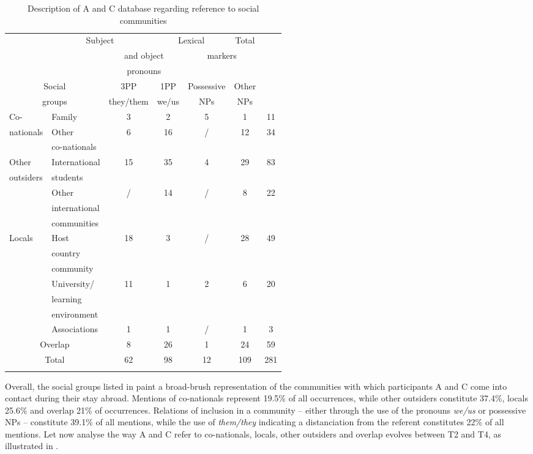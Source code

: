 \documentclass[output=paper]{langscibook}
\begin{document}
\begin{table}
\small
\begin{tabular}{llccccc}
\lsptoprule
\multicolumn{2}{c}{} & \multicolumn{2}{c}{{Subject}} & \multicolumn{2}{c}{{Lexical}} & {Total}\\
\multicolumn{2}{c}{} & \multicolumn{2}{c}{{and object}} & \multicolumn{2}{c}{{markers}} & \\
\multicolumn{2}{c}{} & \multicolumn{2}{c}{{pronouns}} & & \\
\midrule
\multicolumn{2}{c}{{Social}} & {3PP} & {1PP} & {Possessive} & {Other} & \\
\multicolumn{2}{c}{{groups}} &
{they/them} & {we/us} & {NPs} & {NPs} & \\
\midrule
{Co-} & {Family} & 3 & 2 & 5 & 1 & 11\\
{nationals} & {Other}& 6 & 16 & / & 12 & 34\\
&  {co-nationals} & & & & & \\
\midrule
{Other} & {International} & 15 & 35 & 4 & 29 & 83\\
{outsiders} &{students} & & & & & \\
& {Other} & / & 14 & / & 8 & 22\\
&{international}& & & & & \\
&{communities} & & & & & \\
\midrule
{Locals} & {Host} & 18 & 3 & / & 28 & 49\\
 &{country} & & & & & \\
 & {community} & & & & & \\
& {University/} & 11 & 1 & 2 & 6 & 20\\
& {learning} & & & & & \\
& {environment} & & & & & \\
& {Associations} & 1 & 1 & / & 1 & 3\\
\midrule
\multicolumn{2}{c}{{Overlap}} & 8 & 26 & 1 & 24 & 59\\
\midrule
\multicolumn{2}{c}{{Total}} & 62 & 98 & 12 & 109 & 281\\
\lspbottomrule
\end{tabular}
\caption{Description of A and C database regarding reference to social communities\label{tab:saddour:8}}
\end{table}

Overall, the social groups listed in  paint a broad-brush representation of the communities with which participants A and C come into contact during their stay abroad. Mentions of co-nationals represent 19.5\% of all occurrences, while other outsiders constitute 37.4\%, locals 25.6\% and overlap 21\% of occurrences. Relations of inclusion in a community – either through the use of the pronouns \textit{we/us} or possessive NPs – constitute 39.1\% of all mentions, while the use of \textit{them/they} indicating a distanciation from the referent constitutes 22\% of all mentions. Let now analyse the way A and C refer to co-nationals, locals, other outsiders and overlap evolves between T2 and T4, as illustrated in .
\end{document}
